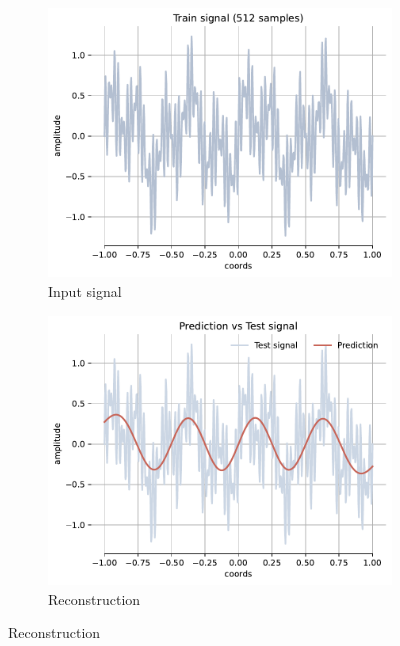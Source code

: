 \begin{figure}[h!]
    \centering
    \begin{subfigure}[b]{0.32\textwidth}
        \centering
        \includegraphics[width=\textwidth]{img/ch3/train_tones512.pdf}
        \caption{Input signal}
        \label{fig:gt-4freqs}
    \end{subfigure}
    \hfill
    \begin{subfigure}[b]{0.32\textwidth}
        \centering
        \includegraphics[width=\textwidth]{img/ch3/prediction_w10_smoothed.pdf}
        \caption{Reconstruction}
        \label{fig:rec-naive-w0}
    \end{subfigure}

\end{figure}
